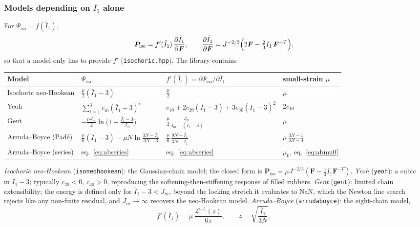 \documentclass[11pt]{article}
\newcommand{\bP}{\bm{P}}
\newcommand{\bF}{\bm{F}}
\newcommand{\Ione}{I_1}
\newcommand{\Ib}{\bar{I}_1}
\DeclareRobustCommand{\code}[1]{{\def\_{\textunderscore\allowbreak}\texttt{#1}}}
\DeclareRobustCommand{\file}[1]{{\def\_{\textunderscore\allowbreak}\texttt{#1}}}
\begin{document}
\subsubsection{Models depending on $\Ib$ alone}

For $\Psi_{\mathrm{iso}} = f(\Ib)$,
\begin{equation}
  \bP_{\mathrm{iso}} = f'(\Ib)\,\frac{\partial\Ib}{\partial\bF},
  \qquad
  \frac{\partial\Ib}{\partial\bF}
  = J^{-2/3}\Bigl(2\bF - \tfrac23\Ione\,\bF^{-T}\Bigr),
  \label{eq:dI1bar}
\end{equation}
so that a model only has to provide $f'$ (\file{isochoric.hpp}).  The
library contains
\begin{center}
\small
\renewcommand{\arraystretch}{1.6}
\begin{tabular}{@{}l l l l@{}}
\toprule
Model & $\Psi_{\mathrm{iso}}$ & $f'(\Ib) = \partial\Psi_{\mathrm{iso}}/\partial\Ib$ & small-strain $\mu$ \\
\midrule
Isochoric neo-Hookean & $\frac{\mu}{2}(\Ib - 3)$ & $\frac{\mu}{2}$ & $\mu$ \\
Yeoh & $\sum_{i=1}^3 c_{i0}(\Ib - 3)^i$ & $c_{10} + 2c_{20}(\Ib-3) + 3c_{30}(\Ib-3)^2$ & $2c_{10}$ \\
Gent & $-\frac{\mu J_m}{2}\ln\bigl(1 - \frac{\Ib - 3}{J_m}\bigr)$ & $\frac{\mu}{2}\frac{J_m}{J_m - (\Ib - 3)}$ & $\mu$ \\
Arruda--Boyce (Pad\'e) & $\frac{\mu}{6}(\Ib - 3) - \mu N\ln\frac{3N - \Ib}{3N - 3}$ & $\frac{\mu}{6}\,\frac{9N - \Ib}{3N - \Ib}$ & $\mu\,\frac{3N - 1}{3N - 3}$ \\
Arruda--Boyce (series) & eq.~\eqref{eq:abseries} & eq.~\eqref{eq:abseries} & $\mu_0$, eq.~\eqref{eq:abmu0} \\
\bottomrule
\end{tabular}
\end{center}
\emph{Isochoric neo-Hookean} (\code{iso\_neo\_hookean}): the Gaussian-chain
model; the closed form is
$\bP_{\mathrm{iso}} = \mu J^{-2/3}(\bF - \tfrac13\Ione\bF^{-T})$.
\emph{Yeoh} (\code{yeoh}): a cubic in $\Ib - 3$; typically $c_{20} < 0$,
$c_{30} > 0$, reproducing the softening-then-stiffening response of filled
rubbers.  \emph{Gent} (\code{gent}): limited chain extensibility; the
energy is defined only for $\Ib - 3 < J_m$, beyond the locking stretch it
evaluates to NaN, which the Newton line search rejects like any non-finite
residual, and $J_m \to \infty$ recovers the neo-Hookean model.
\emph{Arruda--Boyce} (\code{arruda\_boyce}): the eight-chain model,
\begin{equation}
  f'(\Ib) = \mu\,\frac{\mathcal{L}^{-1}(z)}{6z}, \qquad z = \sqrt{\frac{\Ib}{3N}},
  \label{eq:abexact}
\end{equation}
\end{document}
